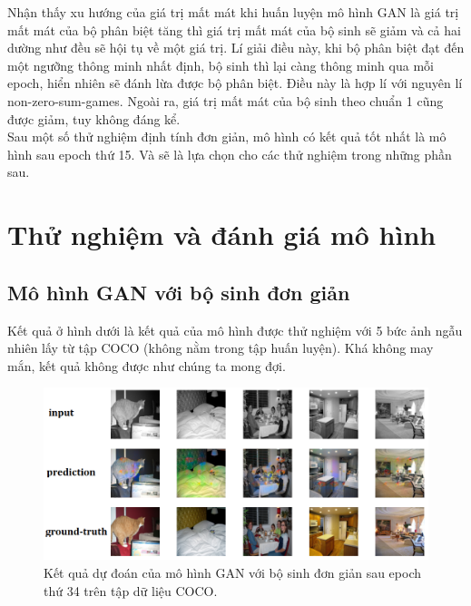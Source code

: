 \documentclass[a4paper, 12pt]{article}
\begin{document}
\noindent
Nhận thấy xu hướng của giá trị mất mát khi huấn luyện mô hình GAN là giá trị mất mát của bộ phân biệt tăng thì giá trị mất mát của bộ sinh sẽ giảm và cả hai dường như đều sẽ hội tụ về một giá trị. Lí giải điều này, khi bộ phân biệt đạt đến một ngưỡng thông minh nhất định, bộ sinh thì lại càng thông minh qua mỗi epoch, hiển nhiên sẽ đánh lừa được bộ phân biệt. Điều này là hợp lí với nguyên lí non-zero-sum-games. Ngoài ra, giá trị mất mát của bộ sinh theo chuẩn 1 cũng được giảm, tuy không đáng kể.\vspace{5pt}\\
Sau một số thử nghiệm định tính đơn giản, mô hình có kết quả tốt nhất là mô hình sau epoch thứ 15. Và sẽ là lựa chọn cho các thử nghiệm trong những phần sau.

\section{Thử nghiệm và đánh giá mô hình}\label{testmodel}

\subsection{Mô hình GAN với bộ sinh đơn giản}\label{badexperiment}

Kết quả ở hình dưới là kết quả của mô hình được thử nghiệm với 5 bức ảnh ngẫu nhiên lấy từ tập COCO (không nằm trong tập huấn luyện). Khá không may mắn, kết quả không được như chúng ta mong đợi.

\begin{figure}[!h]
\captionsetup{width=0.8\textwidth}
\centering
\includegraphics[width=15cm]{images/4_0.png}
\caption{Kết quả dự đoán của mô hình GAN với bộ sinh đơn giản sau epoch thứ 34 trên tập dữ liệu COCO.}
\label{fig:worseexperiment}
\end{figure}
\end{document}
